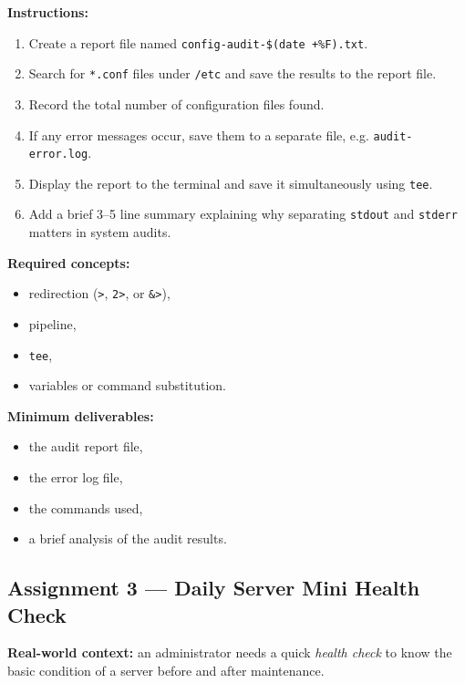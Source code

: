 \textbf{Instructions:}
\begin{enumerate}
  \item Create a report file named
    \texttt{config-audit-\$(date +\%F).txt}.
  \item Search for \texttt{*.conf} files under \texttt{/etc} and save the
    results to the report file.
  \item Record the total number of configuration files found.
  \item If any error messages occur, save them to a separate file, e.g.
    \texttt{audit-error.log}.
  \item Display the report to the terminal and save it simultaneously using
    \texttt{tee}.
  \item Add a brief 3--5 line summary explaining why separating
    \texttt{stdout} and \texttt{stderr} matters in system audits.
\end{enumerate}

\textbf{Required concepts:}
\begin{itemize}
  \item redirection (\texttt{>}, \texttt{2>}, or \texttt{\&>}),
  \item pipeline,
  \item \texttt{tee},
  \item variables or command substitution.
\end{itemize}

\textbf{Minimum deliverables:}
\begin{itemize}
  \item the audit report file,
  \item the error log file,
  \item the commands used,
  \item a brief analysis of the audit results.
\end{itemize}

\subsection*{Assignment 3 --- Daily Server Mini Health Check}
\textbf{Real-world context:} an administrator needs a quick \textit{health
check} to know the basic condition of a server before and after maintenance.

